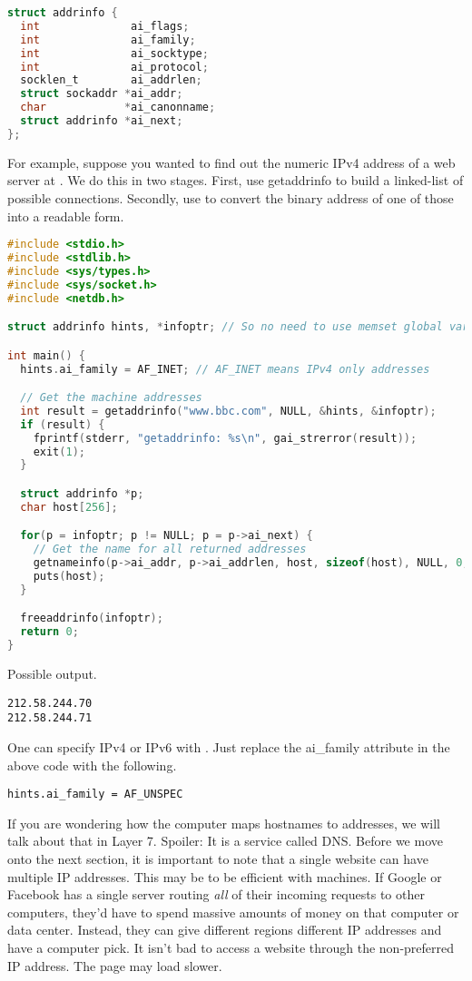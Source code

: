 \begin{lstlisting}[language=C]
struct addrinfo {
  int              ai_flags;
  int              ai_family;
  int              ai_socktype;
  int              ai_protocol;
  socklen_t        ai_addrlen;
  struct sockaddr *ai_addr;
  char            *ai_canonname;
  struct addrinfo *ai_next;
};
\end{lstlisting}

For example, suppose you wanted to find out the numeric IPv4 address of a web server at .
We do this in two stages.
First, use getaddrinfo to build a linked-list of possible connections.
Secondly, use  to convert the binary address of one of those into a readable form.

\begin{lstlisting}[language=C]
#include <stdio.h>
#include <stdlib.h>
#include <sys/types.h>
#include <sys/socket.h>
#include <netdb.h>

struct addrinfo hints, *infoptr; // So no need to use memset global variables

int main() {
  hints.ai_family = AF_INET; // AF_INET means IPv4 only addresses

  // Get the machine addresses
  int result = getaddrinfo("www.bbc.com", NULL, &hints, &infoptr);
  if (result) {
    fprintf(stderr, "getaddrinfo: %s\n", gai_strerror(result));
    exit(1);
  }

  struct addrinfo *p;
  char host[256];

  for(p = infoptr; p != NULL; p = p->ai_next) {
    // Get the name for all returned addresses
    getnameinfo(p->ai_addr, p->ai_addrlen, host, sizeof(host), NULL, 0, NI_NUMERICHOST);
    puts(host);
  }

  freeaddrinfo(infoptr);
  return 0;
}
\end{lstlisting}

Possible output.

\begin{lstlisting}
212.58.244.70
212.58.244.71
\end{lstlisting}

One can specify IPv4 or IPv6 with .
Just replace the ai\_family attribute in the above code with the following.

\begin{lstlisting}
hints.ai_family = AF_UNSPEC
\end{lstlisting}

If you are wondering how the computer maps \gls{hostnames} to addresses, we will talk about that in Layer 7.
Spoiler: It is a service called \gls{DNS}.
Before we move onto the next section, it is important to note that a single website can have multiple IP addresses.
This may be to be efficient with machines.
If Google or Facebook has a single server routing \textit{all} of their incoming requests to other computers, they'd have to spend massive amounts of money on that computer or data center.
Instead, they can give different regions different IP addresses and have a computer pick.
It isn't bad to access a website through the non-preferred IP address.
The page may load slower.

